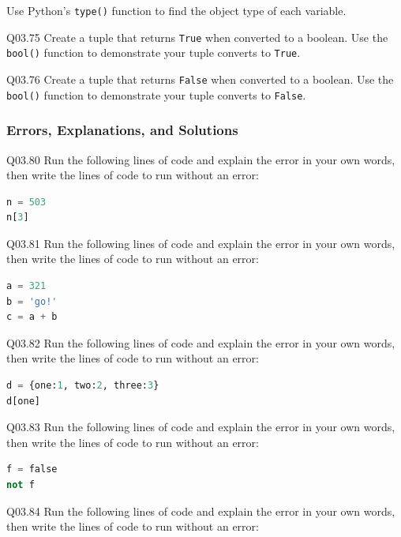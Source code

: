 \documentclass{book}
\newenvironment{problems}{}{}  %
\begin{document}
Use Python's \lstinline!type()! function to find the object type of each
variable.

Q03.75 Create a tuple that returns \lstinline!True! when converted to a
boolean. Use the \lstinline!bool()! function to demonstrate your tuple
converts to \lstinline!True!.

Q03.76 Create a tuple that returns \lstinline!False! when converted to a
boolean. Use the \lstinline!bool()! function to demonstrate your tuple
converts to \lstinline!False!.
    




    
        \begin{problems}
        \subsubsection{Errors, Explanations, and
Solutions}\label{errors-explanations-and-solutions}

Q03.80 Run the following lines of code and explain the error in your own
words, then write the lines of code to run without an error:

\begin{lstlisting}[language=Python]
n = 503
n[3]
\end{lstlisting}

Q03.81 Run the following lines of code and explain the error in your own
words, then write the lines of code to run without an error:

\begin{lstlisting}[language=Python]
a = 321
b = 'go!'
c = a + b
\end{lstlisting}

Q03.82 Run the following lines of code and explain the error in your own
words, then write the lines of code to run without an error:

\begin{lstlisting}[language=Python]
d = {one:1, two:2, three:3}
d[one]
\end{lstlisting}

Q03.83 Run the following lines of code and explain the error in your own
words, then write the lines of code to run without an error:

\begin{lstlisting}[language=Python]
f = false
not f
\end{lstlisting}

Q03.84 Run the following lines of code and explain the error in your own
words, then write the lines of code to run without an error:


\end{problems}
\end{document}
